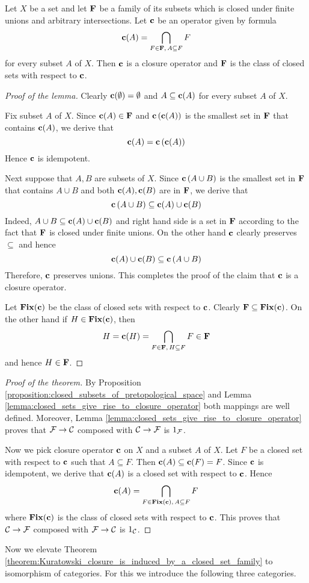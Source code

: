 \begin{lemma}\label{lemma:closed_sets_give_rise_to_closure_operator}
	Let $X$ be a set and let $\mathbf{F}$ be a family of its subsets which is closed under finite unions and arbitrary intersections. Let $\mathbf{c}$ be an operator given by formula
	$$\mathbf{c}(A) = \bigcap_{F\in \mathbf{F},\,A\subseteq F}F$$
	for every subset $A$ of $X$. Then $\mathbf{c}$ is a closure operator and $\mathbf{F}$ is the class of closed sets with respect to $\mathbf{c}$.
\end{lemma}
\begin{proof}[Proof of the lemma]
	Clearly $\mathbf{c}(\emptyset) = \emptyset$ and $A\subseteq \mathbf{c}(A)$ for every subset $A$ of $X$.

	Fix subset $A$ of $X$. Since $\mathbf{c}(A) \in \mathbf{F}$ and $\mathbf{c}\left(\mathbf{c}(A)\right)$ is the smallest set in $\mathbf{F}$ that contains $\mathbf{c}(A)$, we derive that
	$$\mathbf{c}(A) = \mathbf{c}\left(\mathbf{c}(A)\right)$$
	Hence $\mathbf{c}$ is idempotent.

	Next suppose that $A,B$ are subsets of $X$. Since $\mathbf{c}\left(A\cup B\right)$ is the smallest set in $\mathbf{F}$ that contains $A\cup B$ and both $\mathbf{c}(A),\mathbf{c}(B)$ are in $\mathbf{F}$, we derive that
	$$\mathbf{c}\left(A\cup B\right) \subseteq \mathbf{c}(A) \cup \mathbf{c}(B)$$
	Indeed, $A\cup B \subseteq \mathbf{c}(A) \cup \mathbf{c}(B)$ and right hand side is a set in $\mathbf{F}$ according to the fact that $\mathbf{F}$ is closed under finite unions.
	On the other hand $\mathbf{c}$ clearly preserves $\subseteq$ and hence
	$$\mathbf{c}(A)\cup \mathbf{c}(B) \subseteq \mathbf{c}\left(A\cup B\right)$$
	Therefore, $\mathbf{c}$ preserves unions. This completes the proof of the claim that $\mathbf{c}$ is a closure operator.

	Let $\mathbf{Fix}(\mathbf{c})$ be the class of closed sets with respect to $\mathbf{c}$. Clearly $\mathbf{F} \subseteq \mathbf{Fix}(\mathbf{c})$. On the other hand if $H \in \mathbf{Fix}(\mathbf{c})$, then
	$$H = \mathbf{c}(H) = \bigcap_{F\in \mathbf{F},\,H\subseteq F}F \in \mathbf{F}$$
	and hence $H \in \mathbf{F}$.
\end{proof}

\begin{proof}[Proof of the theorem]
	By Proposition \ref{proposition:closed_subsets_of_pretopological_space} and Lemma \ref{lemma:closed_sets_give_rise_to_closure_operator} both mappings are well defined. Moreover, Lemma \ref{lemma:closed_sets_give_rise_to_closure_operator} proves that ${\mathcal F} \rightarrow {\mathcal C}$ composed with ${\mathcal C} \rightarrow {\mathcal F}$ is $1_{{\mathcal F}}$.

	Now we pick closure operator $\mathbf{c}$ on $X$ and a subset $A$ of $X$. Let $F$ be a closed set with respect to $\mathbf{c}$ such that $A\subseteq F$. Then $\mathbf{c}(A) \subseteq \mathbf{c}(F) = F$. Since $\mathbf{c}$ is idempotent, we derive that $\mathbf{c}(A)$ is a closed set with respect to $\mathbf{c}$. Hence
	$$\mathbf{c}(A) = \bigcap_{F\in \mathbf{Fix}(\mathbf{c}),\,A\subseteq F}F$$
	where $\mathbf{Fix}(\mathbf{c})$ is the class of closed sets with respect to $\mathbf{c}$. This proves that ${\mathcal C} \rightarrow {\mathcal F}$ composed with ${\mathcal F} \rightarrow {\mathcal C}$ is $1_{{\mathcal C}}$.
\end{proof}
\noindent
Now we elevate Theorem \ref{theorem:Kuratowski_closure_is_induced_by_a_closed_set_family} to isomorphism of categories. For this we introduce the following three categories.


